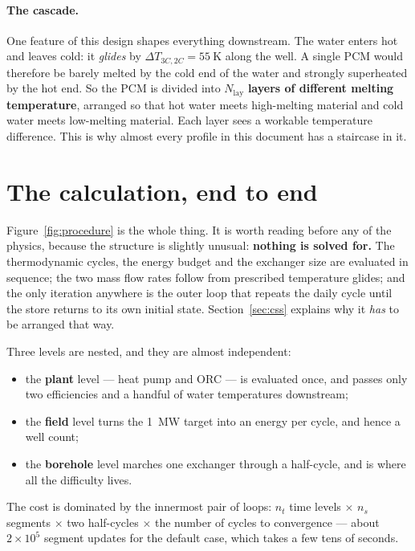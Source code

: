 \documentclass[11pt,a4paper]{article}
\begin{document}
\paragraph{The cascade.}
One feature of this design shapes everything downstream. The water enters hot
and leaves cold: it \emph{glides} by $\Delta T_{3C,2C}=\SI{55}{\kelvin}$ along
the well. A single PCM would therefore be barely melted by the cold end of the
water and strongly superheated by the hot end. So the PCM is divided into
$N_{\mathrm{lay}}$ \textbf{layers of different melting temperature}, arranged so
that hot water meets high-melting material and cold water meets low-melting
material. Each layer sees a workable temperature difference. This is why almost
every profile in this document has a staircase in it.

\section{The calculation, end to end}
\label{sec:procedure}

Figure~\ref{fig:procedure} is the whole thing. It is worth reading before any
of the physics, because the structure is slightly unusual: \textbf{nothing is
solved for.} The thermodynamic cycles, the energy budget and the exchanger size
are evaluated in sequence; the two mass flow rates follow from prescribed
temperature glides; and the only iteration anywhere is the outer loop that
repeats the daily cycle until the store returns to its own initial state.
Section~\ref{sec:css} explains why it \emph{has} to be arranged that way.

Three levels are nested, and they are almost independent:

\begin{itemize}\itemsep2pt
\item the \textbf{plant} level --- heat pump and ORC --- is evaluated once, and
  passes only two efficiencies and a handful of water temperatures downstream;
\item the \textbf{field} level turns the \SI{1}{\mega\watt} target into an
  energy per cycle, and hence a well count;
\item the \textbf{borehole} level marches one exchanger through a half-cycle,
  and is where all the difficulty lives.
\end{itemize}

The cost is dominated by the innermost pair of loops: $n_t$ time levels
$\times$ $n_s$ segments $\times$ two half-cycles $\times$ the number of cycles
to convergence --- about $2\times10^{5}$ segment updates for the default case,
which takes a few tens of seconds.
\end{document}
